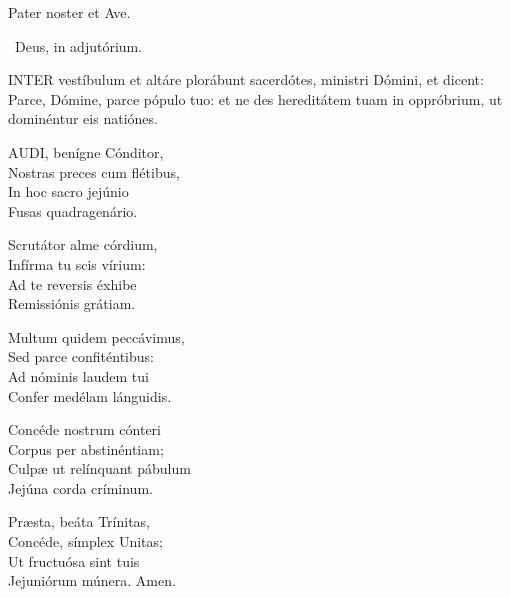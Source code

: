 

Pater noster et Ave.

\V\ Deus, in adjutórium.







\lettrine[lines=2]{I}{NTER} vestíbulum et altáre plorábunt sacerdótes, ministri Dómini, et dicent: Parce, Dómine, parce pópulo tuo: et ne des hereditátem tuam in oppróbrium, ut dominéntur eis natiónes.



\lettrine[lines=2]{A}{UDI}, benígne Cónditor,\\
Nostras preces cum flétibus,\\
In hoc sacro jejúnio\\
Fusas quadragenário.

Scrutátor alme córdium,\\
Infírma tu scis vírium:\\
Ad te reversis éxhibe\\
Remissiónis grátiam.

Multum quidem peccávimus,\\
Sed parce confiténtibus:\\
Ad nóminis laudem tui\\
Confer medélam lánguidis.

Concéde nostrum cónteri\\
Corpus per abstinéntiam;\\
Culpæ ut relínquant pábulum\\
Jejúna corda críminum.


Præsta, beáta Trínitas,\\
Concéde, símplex Unitas;\\
Ut fructuósa sint tuis\\
Jejuniórum múnera. Amen.

